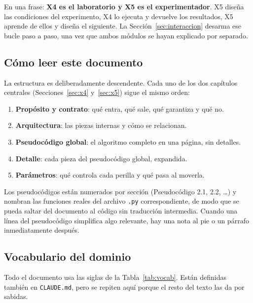 \documentclass[11pt,a4paper]{article}
\newcommand{\code}[1]{\texttt{\small #1}}
\newcommand{\bigsep}{\par\vspace{3pt}}
\begin{document}
\bigsep
En una frase: \textbf{X4 es el laboratorio y X5 es el experimentador}. X5 diseña las
condiciones del experimento, X4 lo ejecuta y devuelve los resultados, X5 aprende de ellos
y diseña el siguiente. La Sección~\ref{sec:interaccion} desarma ese bucle paso a paso, una
vez que ambos módulos se hayan explicado por separado.

\subsection{Cómo leer este documento}

La estructura es deliberadamente descendente. Cada uno de los dos capítulos centrales
(Secciones~\ref{sec:x4} y~\ref{sec:x5}) sigue el mismo orden:

\begin{enumerate}[leftmargin=1.6em,itemsep=2pt]
\item \textbf{Propósito y contrato}: qué entra, qué sale, qué garantiza y qué no.
\item \textbf{Arquitectura}: las piezas internas y cómo se relacionan.
\item \textbf{Pseudocódigo global}: el algoritmo completo en una página, sin detalles.
\item \textbf{Detalle}: cada pieza del pseudocódigo global, expandida.
\item \textbf{Parámetros}: qué controla cada perilla y qué pasa al moverla.
\end{enumerate}

\bigsep
Los pseudocódigos están numerados por sección (Pseudocódigo 2.1, 2.2, \dots) y nombran las
funciones reales del archivo \code{.py} correspondiente, de modo que se pueda saltar del
documento al código sin traducción intermedia. Cuando una línea del pseudocódigo simplifica
algo relevante, hay una nota al pie o un párrafo inmediatamente después.

\subsection{Vocabulario del dominio}
\label{sec:vocab}

Todo el documento usa las siglas de la Tabla~\ref{tab:vocab}. Están definidas también en
\code{CLAUDE.md}, pero se repiten aquí porque el resto del texto las da por sabidas.
\end{document}
